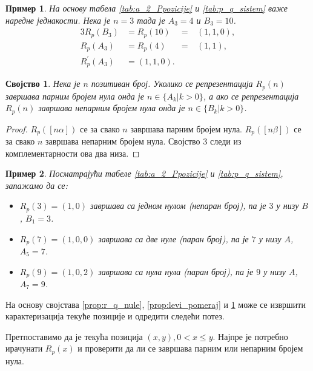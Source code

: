 \documentclass[a4paper]{article}
\newtheorem{example}{Пример}
\newtheorem{property}{Својство}
\begin{document}
\begin{example}
	На основу табела \ref{tab:a_2_Ppozicije} и \ref{tab:p_q_sistem} важе наредне једнакости. Нека је $ n = 3 $ тада је $ A_{3} = 4 $ и $ B_{3} = 10 $.	
	\begin{alignat*}{3}
		R_{p}(B_{3}) &= R_{p}(10)	&= &\ (1, 1, 0),\\
		R_{p}(A_{3}) &= R_{p}(4)	&= &\ (1, 1),\\
		R_{p}^{'}(A_{3}) &= (1, 1, 0).
	\end{alignat*}
\end{example}

\begin{property}
	\label{prop:r_p_nule}
	Нека је $ n $ позитиван број. Уколико се репрезентација $ R_p(n) $ завршава парним бројем нула онда је $ n \in \{A_{k} | k>0\} $, а ако се репрезентација $ R_p(n) $ завршава непарним бројем нула онда је $ n \in \{B_{k} | k>0\} $.
\end{property}

\begin{proof}
	$ R_p([n\alpha]) $ се за свако $ n $ завршава парним бројем нула. $ R_p([n\beta]) $ се за свако $ n $ завршава непарним бројем нула. 
	Својство 3 следи из комплементарности ова два низа.
\end{proof}

\begin{example}
	Посматрајући табеле \ref{tab:a_2_Ppozicije} и \ref{tab:p_q_sistem}, запажамо да се:
	\begin{itemize}
		\item $ R_{p}(3) = (1, 0) $ завршава са једном нулом (непаран број), па је $ 3 $ у низу $ B $, $ B_{1} = 3 $. 
		\item $ R_{p}(7) = (1, 0, 0) $ завршава са две нуле (паран број), па је $ 7 $ у низу $ A $, $ A_{5} = 7 $.
		\item $ R_{p}(9) = (1, 0, 2) $ завршава са нула нула (паран број), па је $ 9 $ у низу $ A $, $ A_{7} = 9 $.
	\end{itemize}
\end{example}

На основу својстава \ref{prop:r_q_nule}, \ref{prop:levi_pomeraj} и \ref{prop:r_p_nule} може се извршити карактеризација текуће позиције и одредити следећи потез.

Претпоставимо да је текућа позиција $ (x, y), 0 < x \le y $. Најпре је потребно ирачунати $ R_{p}(x) $ и проверити да ли се завршава парним или непарним бројем нула.
\end{document}
